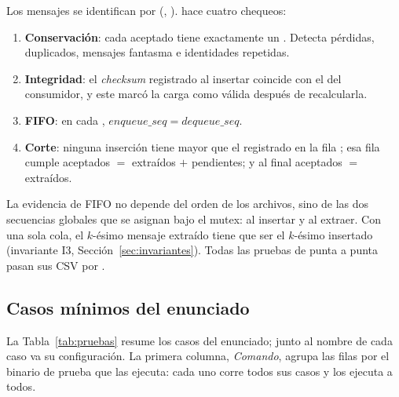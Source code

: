 Los mensajes se identifican por (, ).
 hace cuatro chequeos:
\begin{enumerate}
  \item \textbf{Conservación}: cada  aceptado tiene exactamente
  un . Detecta pérdidas, duplicados, mensajes fantasma e
  identidades repetidas.
  \item \textbf{Integridad}: el \emph{checksum} registrado al insertar
  coincide con el del consumidor, y este marcó la carga como válida
  después de recalcularla.
  \item \textbf{FIFO}: en cada ,
  $\mathit{enqueue\_seq}=\mathit{dequeue\_seq}$.
  \item \textbf{Corte}: ninguna inserción tiene  mayor
  que el registrado en la fila ; esa fila cumple aceptados
  $=$ extraídos $+$ pendientes; y al final aceptados $=$ extraídos.
\end{enumerate}

La evidencia de FIFO
no depende del orden de los archivos, sino de las dos secuencias globales
que se asignan bajo el mutex:  al insertar y
 al extraer. Con una sola cola, el $k$-ésimo mensaje
extraído tiene que ser el $k$-ésimo insertado (invariante I3,
Sección~\ref{sec:invariantes}). Todas las pruebas de
punta a punta pasan sus CSV por .

\subsection{Casos mínimos del enunciado}

La Tabla~\ref{tab:pruebas} resume los casos del enunciado; junto al nombre
de cada caso va su configuración. La primera columna, \emph{Comando}, agrupa las filas por el binario de
prueba que las ejecuta: cada uno corre todos sus casos y  los ejecuta a
todos.


